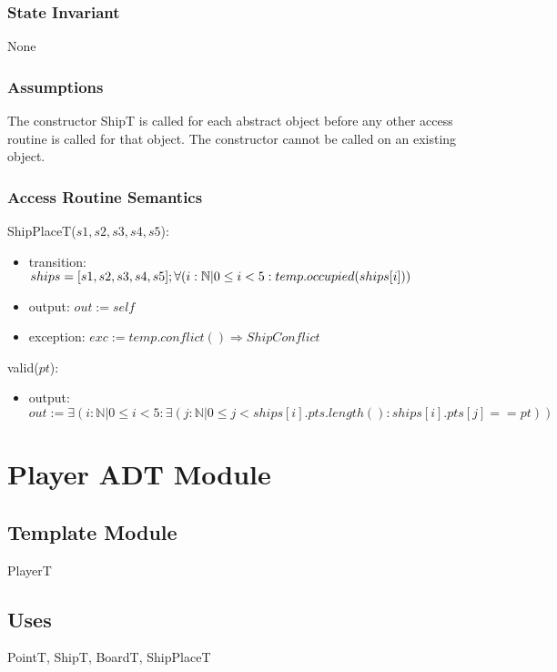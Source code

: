 \documentclass[12pt]{article}
\begin{document}
\subsubsection* {State Invariant}
None

\subsubsection* {Assumptions}
The constructor ShipT is called for each abstract object before any other access routine is called for that
object.  The constructor cannot be called on an existing object.

\subsubsection* {Access Routine Semantics}

\noindent ShipPlaceT($s1,s2,s3,s4,s5$):
\begin{itemize}
\item transition: $ships = [s1,s2,s3,s4,s5] ; \\
\forall (i:\mathbb{N} | 0 \leq i < 5: temp.occupied(ships[i]))$
\item output: $out := \mathit{self}$
\item exception: $exc:= temp.conflict() \Rightarrow ShipConflict$
\end{itemize}

\noindent valid($pt$):
\begin{itemize}
\item output: $out := \exists (i:\mathbb{N} | 0 \leq i < 5 :
\exists(j:\mathbb{N} | 0 \leq j < ships[i].pts.length() : ships[i].pts[j] == pt))$
\end{itemize}

\newpage
\section* {Player ADT Module}

\subsection* {Template Module}

PlayerT

\subsection* {Uses}

PointT, ShipT, BoardT, ShipPlaceT
\end{document}
